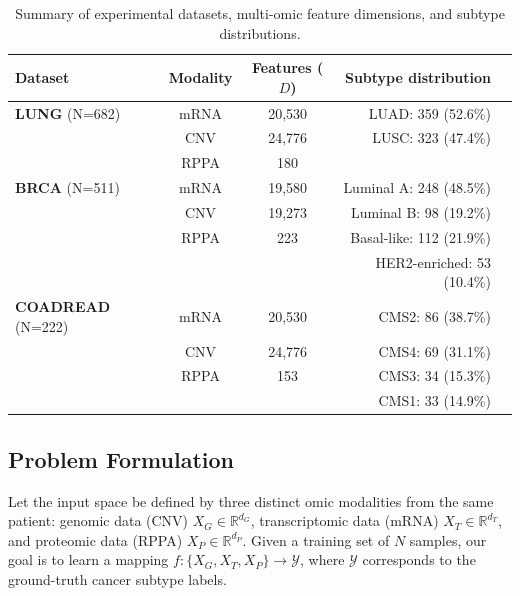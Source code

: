 \documentclass[lettersize,journal]{IEEEtran}
\begin{document}
\begin{table}[htbp]
\centering
\caption{Summary of experimental datasets, multi-omic feature dimensions, and subtype distributions.}
\label{tab:dataset_summary}
\small
\begin{tabular}{@{}lccrX@{}}
\toprule
\textbf{Dataset} & \textbf{Modality} & \textbf{Features ($D$)} & \textbf{Subtype distribution} \\ 
\midrule
\textbf{LUNG} (N=682) & mRNA & 20,530 & LUAD: 359 (52.6\%) \\
 &  CNV & 24,776 & LUSC: 323 (47.4\%) \\
 &  RPPA & 180 &  \\ 
\midrule


\textbf{BRCA} (N=511) & mRNA & 19,580 & Luminal A: 248 (48.5\%) \\
 & CNV & 19,273 & Luminal B: 98 (19.2\%) \\
 & RPPA & 223 & Basal-like: 112 (21.9\%) \\
 & & & HER2-enriched: 53 (10.4\%) \\
 
\midrule
\textbf{COADREAD} (N=222) & mRNA & 20,530 & CMS2: 86 (38.7\%)\\
 & CNV & 24,776 & CMS4: 69 (31.1\%)\\
 & RPPA & 153 & CMS3: 34 (15.3\%) \\ 
 &  &  & CMS1: 33 (14.9\%) \\ 

\bottomrule
\end{tabular}
\end{table}

\subsection{Problem Formulation}
Let the input space be defined by three distinct omic modalities from the same patient: genomic data (CNV) $X_{G} \in \mathbb{R}^{d_G}$, transcriptomic data (mRNA) $X_{T} \in \mathbb{R}^{d_T}$, and proteomic data (RPPA) $X_{P} \in \mathbb{R}^{d_P}$. Given a training set of $N$ samples, our goal is to learn a mapping $f: \{X_G, X_T, X_P\} \rightarrow \mathcal{Y}$, where $\mathcal{Y}$ corresponds to the ground-truth cancer subtype labels.
\end{document}
